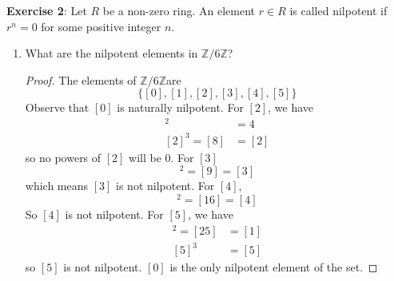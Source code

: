 \documentclass{article}
\begin{document}
\textbf{Exercise 2}: Let $R$ be a non-zero ring. An element $r \in R$ is called nilpotent if $r^{n} = 0$ for some positive integer $n$. 
    \begin{enumerate}
        \item What are the nilpotent elements in $\mathbb{Z}/6\mathbb{Z}$?

            \begin{proof}
                The elements of $\mathbb{Z}/6\mathbb{Z}$are 
                \begin{equation*}
                    \{[0], [1], [2], [3], [4], [5]\}
                \end{equation*}
                Observe that $[0]$ is naturally nilpotent. For $[2]$, we have
                \begin{align*}
                    [2]^{2} &= 4 \\
                    [2]^{3} = [8] &= [2]
                \end{align*}
                so no powers of $[2]$ will be 0. For $[3]$
                \begin{equation*}
                    [3]^{2} = [9] = [3]
                \end{equation*}
                which means $[3]$ is not nilpotent. For $[4]$, 
                \begin{equation*}
                    [4]^{2} = [16]  = [4]
                \end{equation*}
                So $[4]$ is not nilpotent. For $[5]$, we have 
                \begin{align*}
                    [5]^{2} = [25] &= [1] \\
                    [5]^{3} &= [5]
                \end{align*}
                so $[5]$ is not nilpotent. $[0]$ is the only nilpotent element of the set.
            \end{proof}


\end{enumerate}
\end{document}
